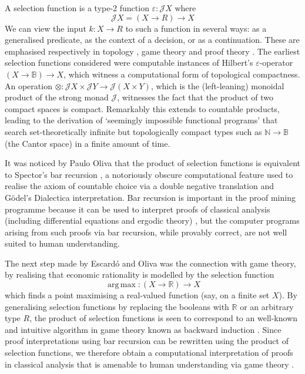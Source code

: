 \documentclass{article}
\newcommand\B{\mathbb B}
\newcommand\R{\mathbb R}
\newcommand\J{\mathscr J}
\newcommand\argmax{\operatorname{arg\,max}}
\begin{document}
A selection function is a type-2 function $\varepsilon : \J X$ where
\[ \J X = (X \to R) \to X \]
We can view the input $k : X \to R$ to such a function in several ways: as a generalised predicate, as the context of a decision, or as a continuation. These are emphasised respectively in topology \citep{escardo08}, game theory \citep{escardo11} and proof theory \citep{escardo12b}. The earliest selection functions considered were computable instances of Hilbert's $\varepsilon$-operator $(X \to \B) \to X$, which witness a computational form of topological compactness. An operation $\otimes : \J X \times \J Y \to \J (X \times Y)$, which is the (left-leaning) monoidal product of the strong monad $\J$, witnesses the fact that the product of two compact spaces is compact. Remarkably this extends to countable products, leading to the derivation of `seemingly impossible functional programs' \citep{escardo07} that search set-theoretically infinite but topologically compact types such as $\mathbb N \to \B$ (the Cantor space) in a finite amount of time.

It was noticed by Paulo Oliva that the product of selection functions is equivalent to Spector's bar recursion \citep{escardo14}, a notoriously obscure computational feature used to realise the axiom of countable choice via a double negative translation and G\"odel's Dialectica interpretation. Bar recursion is important in the proof mining programme because it can be used to interpret proofs of classical analysis (including differential equations and ergodic theory) \citep{kohlenbach08}, but the computer programs arising from such proofs via bar recursion, while provably correct, are not well suited to human understanding.

The next step made by Escard\'o and Oliva was the connection with game theory, by realising that economic rationality is modelled by the selection function
\[ \argmax : (X \to \R) \to X \]
which finds a point maximising a real-valued function (say, on a finite set $X$). By generalising selection functions by replacing the booleans with $\R$ or an arbitrary type $R$, the product of selection functions is seen to correspond to an well-known and intuitive algorithm in game theory known as backward induction \citep{escardo11}. Since proof interpretations using bar recursion can be rewritten using the product of selection functions, we therefore obtain a computational interpretation of proofs in classical analysis that is amenable to human understanding via game theory \citep{oliva12b}.
\end{document}
